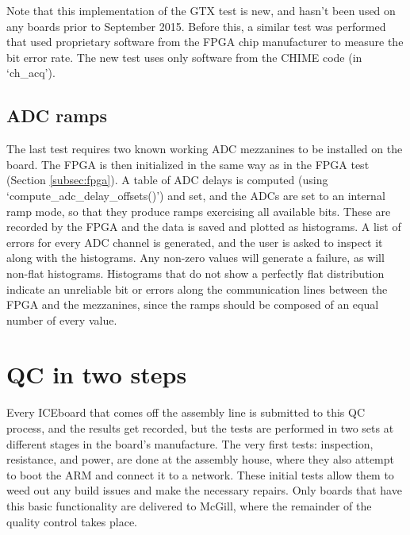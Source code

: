 \documentclass[11pt,article]{memoir}
\begin{document}
Note that this implementation of the GTX test is new, and hasn't been used on any boards prior to September 2015. Before this, a similar test was performed that used proprietary software from the FPGA chip manufacturer to measure the bit error rate. The new test uses only software from the CHIME code (in `ch\_acq').


\subsection{ADC ramps}
The last test requires two known working ADC mezzanines to be installed on the board. The FPGA is then initialized in the same way as in the FPGA test (Section \ref{subsec:fpga}). A table of ADC delays is computed (using `compute\_adc\_delay\_offsets()') and set, and the ADCs are set to an internal ramp mode, so that they produce ramps exercising all available bits. These are recorded by the FPGA and the data is saved and plotted as histograms. A list of errors for every ADC channel is generated, and the user is asked to inspect it along with the histograms. Any non-zero values will generate a failure, as will non-flat histograms. Histograms that do not show a perfectly flat distribution indicate an unreliable bit or errors along the communication lines between the FPGA and the mezzanines, since the ramps should be composed of an equal number of every value.


\section{QC in two steps}
Every ICEboard that comes off the assembly line is submitted to this QC process, and the results get recorded, but the tests are performed in two sets at different stages in the board's manufacture. The very first tests: inspection, resistance, and power, are done at the assembly house, where they also attempt to boot the ARM and connect it to a network. These initial tests allow them to weed out any build issues and make the necessary repairs. Only boards that have this basic functionality are delivered to McGill, where the remainder of the quality control takes place.


\appendix

\end{document}
